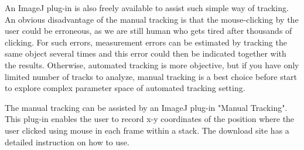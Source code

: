 \documentclass[11pnt]{article}
\begin{document}
An ImageJ plug-in is also freely available to assist such simple way of
tracking. An obvious disadvantage of the manual tracking is that the
mouse-clicking by the user could be erroneous, as we are still human
who gets tired after thousands of clicking. For such errors,
measurement errors can be estimated by tracking the same object several
times and this error could then be indicated together with the results.
Otherwise, automated tracking is more objective, but if you have only
limited number of tracks to analyze, manual tracking is a best choice
before start to explore complex parameter space of automated tracking
setting.

The manual tracking can be assisted by an ImageJ plug-in
"Manual Tracking". This plug-in
enables the user to record x-y coordinates of the position where the
user clicked using mouse in each frame within a stack. The download
site has a detailed instruction on how to use.  
\end{document}
